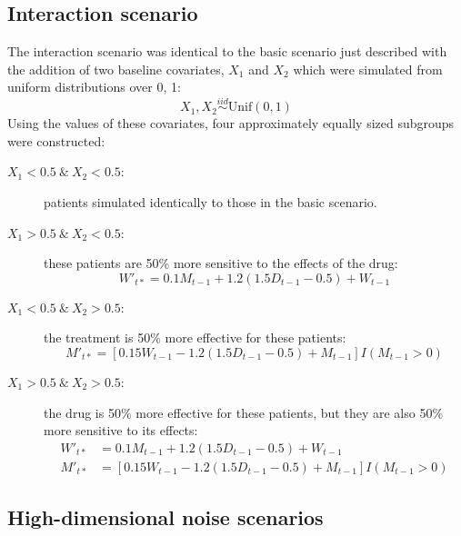 \documentclass[12pt]{article}
\begin{document}


\subsection{Interaction scenario} %
\label{sub:subgroups_interaction}

The interaction scenario was identical to the basic scenario just described with the addition of two baseline covariates, $X_{1}$ and $X_{2}$ which were simulated from uniform distributions over 0, 1:
\begin{equation}
  X_{1}, X_{2} \overset{iid}{\sim} \text{Unif}(0, 1)
\end{equation}
Using the values of these covariates, four approximately equally sized subgroups were constructed:
\begin{description}
  \item [$X_{1} < 0.5 \ \& \ X_{2} < 0.5$:] patients simulated identically to those in the basic scenario.
  \item [$X_{1} > 0.5 \ \& \ X_{2} < 0.5$:] these patients are 50\% more sensitive to the effects of the drug:
   \begin{equation}
   W'_{t*} = 0.1 M_{t-1} + 1.2 (1.5 D_{t-1} - 0.5) + W_{t - 1}
   \end{equation}
   \item [$X_{1} < 0.5 \ \& \ X_{2} > 0.5$:] the treatment is 50\% more effective for these patients:
\begin{equation}
M'_{t*} = [0.15 W_{t-1} - 1.2 (1.5 D_{t-1} - 0.5) + M_{t - 1}] I(M_{t-1} > 0)
\end{equation}
   \item [$X_{1} > 0.5 \ \& \ X_{2} > 0.5$:] the drug is 50\% more effective for these patients, but they are also 50\% more sensitive to its effects:
   \begin{align}
   W'_{t*} &= 0.1 M_{t-1} + 1.2 (1.5 D_{t-1} - 0.5) + W_{t - 1} \\
   M'_{t*} &= [0.15 W_{t-1} - 1.2 (1.5 D_{t-1} - 0.5) + M_{t - 1}] I(M_{t-1} > 0)
   \end{align}
\end{description}


\subsection{High-dimensional noise scenarios} %
\label{sub:noise_variables}
\end{document}

